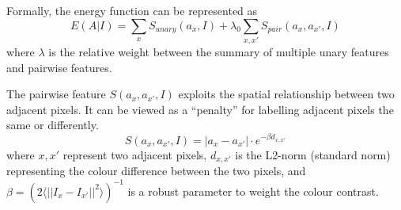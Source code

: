 \documentclass[10pt,twocolumn,letterpaper]{article}
\newcommand{\SUM}{\sum\limits}
\begin{document}
    Formally, the energy function can be represented as
    $$
    E(A|I) = \SUM_x S_{unary}(a_x,I) + \lambda_0 \SUM_{x,x'}S_{pair}(a_x,a_{x'},I)
    $$
    where $\lambda$ is the relative weight between the summary of multiple unary features and pairwise features. 

    The pairwise feature $S(a_x,a_{x'},I)$ exploits the spatial relationship between two adjacent pixels.  It can be viewed as a ``penalty'' for labelling adjacent pixels the same or differently.
    $$
    S(a_x,a_{x'},I) = |a_x-a_{x'}| \cdot e^{-\beta d_{x,x'}}
    $$
    where $x,x'$ represent two adjacent pixels, $d_{x,x'}$ is the L2-norm (standard norm) representing the colour difference between the two pixels, and $\beta=(2\langle||I_x-I_{x'}||^2\rangle)^{-1}$ is a robust parameter to weight the colour contrast.
    
\end{document}
